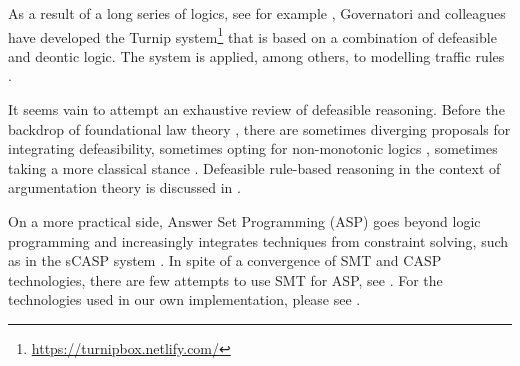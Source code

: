 As a result of a long series of logics, see for example
\cite{governatori_carnead_defeas_logic_icail_2011,governatori21:_unrav_legal_refer_defeas_deont_logic},
Governatori and colleagues have developed the Turnip
system\footnote{\url{https://turnipbox.netlify.com/}} that is based on a
combination of defeasible and deontic logic. The system is applied, among
others, to modelling traffic rules
\cite{governatori_Traffic_Rules_Encoding_using_Defeasible_jurix_2020}.

It seems vain to attempt an exhaustive
review of defeasible reasoning. Before the backdrop of foundational law
theory \cite{hart_concept_of_law_1997}, there are sometimes diverging
proposals for integrating defeasibility, sometimes opting for non-monotonic
logics \cite{hage_law_and_defeasibility_2003}, sometimes taking a more
classical stance \cite{alchourron_makinson_hierarchies_of_regulations_1981}. 
Defeasible rule-based reasoning in the context of argumentation theory is
discussed in \cite{dung_argumentation_theory_1995,amgoud_besnard_rule_based_argumentation_systems_2019}.

On a more practical side, Answer Set Programming (ASP) \cite{asp_background}
goes beyond logic programming and increasingly integrates techniques from
constraint solving, such as in the sCASP system
\cite{arias_phd_2019}. In spite of a convergence of SMT and CASP technologies,
there are few attempts to use SMT for ASP, see
\cite{shen_lierler_smt_answer_set_kr_2018}. For the technologies used in our
own implementation, please see . 




